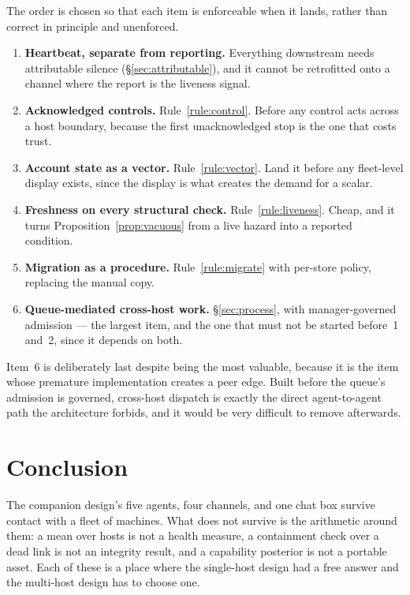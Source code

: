 \documentclass[11pt]{article}
\begin{document}
The order is chosen so that each item is enforceable when it lands, rather than correct in principle and unenforced.

\begin{enumerate}
\item \textbf{Heartbeat, separate from reporting.} Everything downstream needs attributable silence (\S\ref{sec:attributable}), and it cannot be retrofitted onto a channel where the report is the liveness signal.
\item \textbf{Acknowledged controls.} Rule~\ref{rule:control}. Before any control acts across a host boundary, because the first unacknowledged stop is the one that costs trust.
\item \textbf{Account state as a vector.} Rule~\ref{rule:vector}. Land it before any fleet-level display exists, since the display is what creates the demand for a scalar.
\item \textbf{Freshness on every structural check.} Rule~\ref{rule:liveness}. Cheap, and it turns Proposition~\ref{prop:vacuous} from a live hazard into a reported condition.
\item \textbf{Migration as a procedure.} Rule~\ref{rule:migrate} with per-store policy, replacing the manual copy.
\item \textbf{Queue-mediated cross-host work.} \S\ref{sec:process}, with manager-governed admission --- the largest item, and the one that must not be started before~1 and~2, since it depends on both.
\end{enumerate}

Item~6 is deliberately last despite being the most valuable, because it is the item whose premature implementation creates a peer edge. Built before the queue's admission is governed, cross-host dispatch is exactly the direct agent-to-agent path the architecture forbids, and it would be very difficult to remove afterwards.

\section{Conclusion}
\label{sec:conclusion}

The companion design's five agents, four channels, and one chat box survive contact with a fleet of machines. What does not survive is the arithmetic around them: a mean over hosts is not a health measure, a containment check over a dead link is not an integrity result, and a capability posterior is not a portable asset. Each of these is a place where the single-host design had a free answer and the multi-host design has to choose one.
\end{document}
